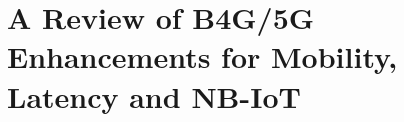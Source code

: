 \chapter{A Review of B4G/5G Enhancements for Mobility, Latency and NB-I\lowercase{o}T}

\begin{center}
{\large\uppercase{}} 

\vskip -6pt



\bigskip
{\large\uppercase{}} 

\vskip -6pt

\end{center}

\vskip 2cm




\vfill




\newpage

